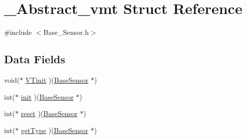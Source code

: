\hypertarget{struct___abstract__vmt}{\section{\-\_\-\-Abstract\-\_\-vmt Struct Reference}
\label{struct___abstract__vmt}
}


{\ttfamily \#include $<$Base\-\_\-\-Sensor.\-h$>$}

\subsection*{Data Fields}
\begin{DoxyCompactItemize}
\item 
void($\ast$ \hyperlink{struct___abstract__vmt_a74e82c0ad9f3badb232406c888692d48}{V\-Tinit} )(\hyperlink{_base___sensor_8h_ae91aa07b7bce6c6b463d63d8f214bb37}{Base\-Sensor} $\ast$)
\item 
int($\ast$ \hyperlink{struct___abstract__vmt_aac6a2ceee8ce6dbda464db9dabc3864b}{init} )(\hyperlink{_base___sensor_8h_ae91aa07b7bce6c6b463d63d8f214bb37}{Base\-Sensor} $\ast$)
\item 
int($\ast$ \hyperlink{struct___abstract__vmt_af1a8c2caa6f589005dc89c632f56fc40}{reset} )(\hyperlink{_base___sensor_8h_ae91aa07b7bce6c6b463d63d8f214bb37}{Base\-Sensor} $\ast$)
\item 
int($\ast$ \hyperlink{struct___abstract__vmt_a06cf269c6b06098cd3e820eb993dd422}{get\-Type} )(\hyperlink{_base___sensor_8h_ae91aa07b7bce6c6b463d63d8f214bb37}{Base\-Sensor} $\ast$)
\end{DoxyCompactItemize}


